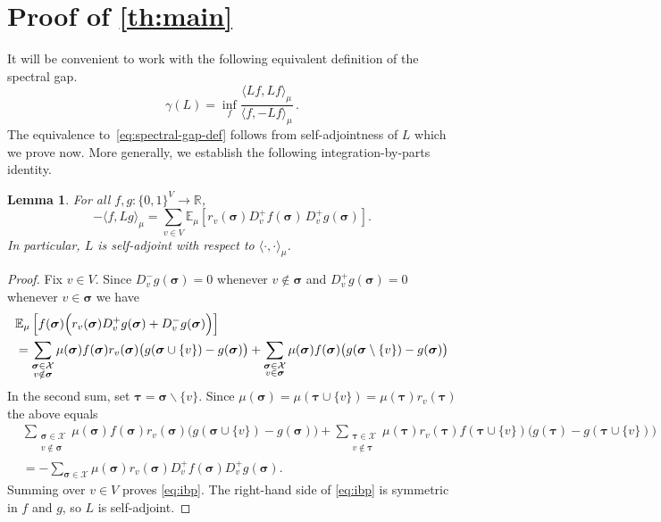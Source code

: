 \documentclass[10pt]{amsart}
\newtheorem{lemma}[theorem]{Lemma}
\newcommand{\E}{\mathbb{E}}
\newcommand{\sigmabf}{ \boldsymbol{\sigma} }
\newcommand{\taubf}{ \boldsymbol{\tau} }
\begin{document}
	
	
	\section{Proof of \texorpdfstring{\cref{th:main}}{Theorem 1.2}}
	It will be convenient to work with the following equivalent definition of the spectral gap. 
	\[
	\gamma(L) = \inf_{f} \frac{\langle Lf,Lf\rangle_\mu}{\langle f, -Lf\rangle_\mu}\,.
	\]
	The equivalence to~\eqref{eq:spectral-gap-def} follows from self-adjointness of $L$ which we prove now. More generally, we establish the following integration-by-parts identity. 
	
	\begin{lemma}\label{lem:ibp}
		For all $f,g:\{0,1\}^V\to\mathbb R$,
		\begin{equation}\label{eq:ibp}
			-\langle f,Lg\rangle_\mu
			=
			\sum_{v\in V}\E_\mu\left[r_v(\sigmabf)D_v^+f(\sigmabf)\,D_v^+g(\sigmabf)
			\right].
		\end{equation}
		In particular, $L$ is self-adjoint with respect to $\langle \cdot,\cdot\rangle_\mu$.
	\end{lemma}
	
	\begin{proof}
		Fix $v\in V$. Since $D_v^-g(\sigmabf)=0$ whenever $v\notin \sigmabf$ and $D_v^+g(\sigmabf)=0$ whenever $v\in \sigmabf$ we have
		\begin{align*}
			&\E_\mu\left[f(\sigmabf)\Bigl(r_v(\sigmabf)D_v^+g(\sigmabf)+D_v^-g(\sigmabf)\Bigr)\right] \\
			&=
			\sum_{\substack{\sigmabf\in\mathcal X\\ v\notin \sigmabf}}
			\mu(\sigmabf)f(\sigmabf)r_v(\sigmabf)\bigl(g(\sigmabf\cup\{v\})-g(\sigmabf)\bigr)
			+
			\sum_{\substack{\sigmabf\in\mathcal X\\ v\in \sigmabf}}
			\mu(\sigmabf)f(\sigmabf)\bigl(g(\sigmabf\setminus\{v\})-g(\sigmabf)\bigr)
		\end{align*}
		In the second sum, set $\taubf=\sigmabf\backslash\{v\}$. 
		Since
		\(
		\mu(\sigmabf)=\mu(\taubf \cup\{v\})=\mu(\taubf)r_v(\taubf)
		\)
		the above equals
		\begin{align*}
			&\sum_{\substack{\sigmabf\in\mathcal X\\ v\notin \sigmabf}}
			\mu(\sigmabf)f(\sigmabf)r_v(\sigmabf)\bigl(g(\sigmabf\cup\{v\})-g(\sigmabf)\bigr)
			+
			\sum_{\substack{\taubf\in\mathcal X\\ v\notin \taubf}}
			\mu(\taubf)r_v(\taubf) f(\taubf \cup\{v\})\bigl(g(\taubf)-g(\taubf \cup\{v\})\bigr) \\
			&=
			-\sum_{\sigmabf\in\mathcal X}
			\mu(\sigmabf)r_v(\sigmabf) D_v^+f(\sigmabf) D_v^+g(\sigmabf).
		\end{align*}
		Summing over $v\in V$ proves \eqref{eq:ibp}.
		The right-hand side of \eqref{eq:ibp} is symmetric in $f$ and $g$, so $L$ is self-adjoint. 
	\end{proof}
	
\end{document}
